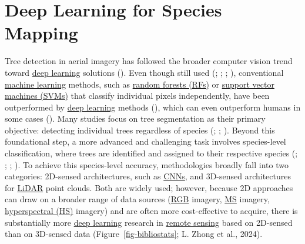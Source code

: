 \documentclass[
]{scrreprt}
\begin{document}
\section{Deep Learning for Species
Mapping}\label{deep-learning-for-species-mapping}

Tree detection in aerial imagery has followed the broader computer
vision trend toward \hyperref[acronyms_DL]{deep learning} solutions
(). Even though
still used (;
;
;
),
conventional \hyperref[acronyms_ML]{machine learning} methods, such as
\hyperref[acronyms_RF]{random forests (RFs)} or
\hyperref[acronyms_SVM]{support vector machines (SVMs)} that classify
individual pixels independently, have been outperformed by
\hyperref[acronyms_DL]{deep learning} methods
(), which can even
outperform humans in some cases
(). Many
studies focus on tree segmentation as their primary objective: detecting
individual trees regardless of species
(;
;
). Beyond this
foundational step, a more advanced and challenging task involves
species-level classification, where trees are identified and assigned to
their respective species
(;
; ; ).
To achieve this species-level accuracy, methodologies broadly fall into
two categories: 2D-sensed architectures, such as
\hyperref[acronyms_CNN]{CNNs}, and 3D-sensed architectures for
\hyperref[acronyms_LiDAR]{LiDAR} point clouds. Both are widely used;
however, because 2D approaches can draw on a broader range of data
sources (\hyperref[acronyms_RGB]{RGB} imagery,
\hyperref[acronyms_MS]{MS} imagery,
\hyperref[acronyms_HS]{hyperspectral (HS)} imagery) and are often more
cost-effective to acquire, there is substantially more
\hyperref[acronyms_DL]{deep learning} research in
\hyperref[acronyms_RS]{remote sensing} based on 2D-sensed than on
3D-sensed data (Figure~\ref{fig-bibliostats}; L. Zhong et al., 2024).
\end{document}
